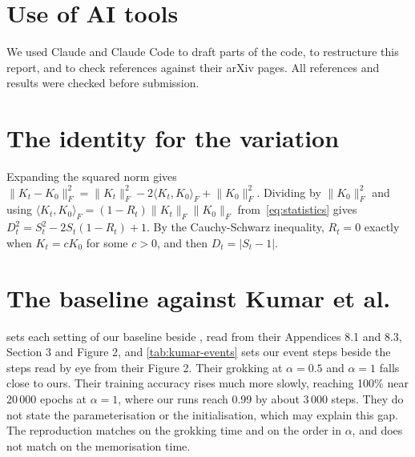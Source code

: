 \documentclass[a4paper,11pt]{article} %
\newcommand{\Fnorm}[1]{\lVert #1\rVert_F}
\begin{document}


\section*{Use of AI tools}

We used Claude and Claude Code to draft parts of the code, to restructure this report,
and to check references against their arXiv pages. All references and results were checked before submission.


\clearpage
\appendix


\section{The identity for the variation}\label{app:identity}

Expanding the squared norm gives
$\Fnorm{K_t-K_0}^2=\Fnorm{K_t}^2-2\langle K_t,K_0\rangle_F+\Fnorm{K_0}^2$.
Dividing by $\Fnorm{K_0}^2$ and using
$\langle K_t,K_0\rangle_F=(1-R_t)\Fnorm{K_t}\Fnorm{K_0}$
from~\eqref{eq:statistics} gives $D_t^2=S_t^2-2S_t(1-R_t)+1$. By the
Cauchy-Schwarz
inequality, $R_t=0$ exactly when $K_t=cK_0$ for some $c>0$, and then
$D_t=\lvert S_t-1\rvert$.

\section{The baseline against Kumar et al.}\label{app:kumar}

 sets each setting of our baseline beside
\citet[arXiv v3]{kumarGrokkingTransitionLazy2024}, read from their Appendices
8.1 and 8.3, Section 3 and Figure 2, and \cref{tab:kumar-events} sets our event
steps beside the steps read by eye from their Figure 2. Their grokking at
$\alpha=0.5$ and $\alpha=1$ falls close to ours. Their training accuracy rises
much more slowly, reaching 100\% near 20\,000 epochs at $\alpha=1$, where our
runs reach 0.99 by about 3\,000 steps. They do not state the parameterisation
or the initialisation, which may explain this gap. The reproduction
matches on the grokking time and on the order in $\alpha$, and does not match
on the memorisation time.
\end{document}
